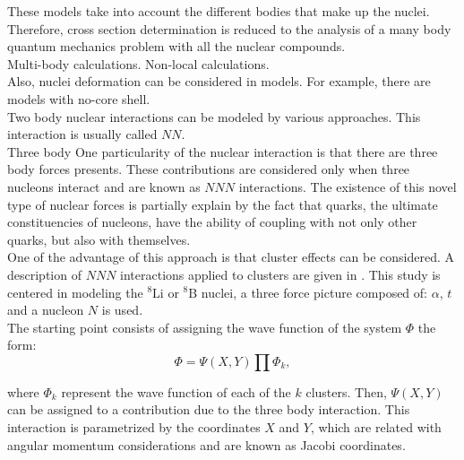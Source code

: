 \documentclass[openany]{book}
\begin{document}
These models take into account the different bodies that make up the nuclei. \\

Therefore,  cross section determination is reduced to the analysis of a many body quantum mechanics problem with all the nuclear compounds. \\

Multi-body calculations.  Non-local calculations. \\

Also, nuclei deformation can be considered in models. For example, there are models with no-core shell. \\

Two body nuclear interactions can be modeled by various approaches. This interaction is usually called $NN$. \\

Three body \cite{grigorenko_danilin_efros_shulgina_zhukov_1998}
One particularity of the nuclear interaction is that there are three body forces presents.  These contributions are considered only when three nucleons interact and are known as $NNN$ interactions. The existence of this novel type of nuclear forces is partially explain by the fact that quarks, the ultimate constituencies of nucleons, have the ability of coupling with not only other quarks, but also with themselves. \\

One of the advantage of this approach is that cluster effects can be considered. A description of $NNN$ interactions applied to clusters are given in  \cite{grigorenko_danilin_efros_shulgina_zhukov_1998}. This study is centered in modeling the $\mathrm{{}^{8}Li}$ or $\mathrm{{}^{8}B}$ nuclei, a three force picture composed of: $\alpha$, $t$ and a nucleon $N$ is used.  \\

The starting point consists of assigning the wave function of the system  $\Phi$  the form:  \\

\begin{equation}\label{eq:micro_threeBody_wavefunction}
	\Phi = \Psi(X, Y) \prod \Phi_k, 
\end{equation}

where $\Phi_k$ represent the wave function of each of the $k$ clusters. Then, $\Psi(X, Y)$ can be assigned to a contribution due to the three body interaction. This interaction is parametrized by the coordinates $X$ and $Y$,  which are related with angular momentum considerations and are known as Jacobi coordinates. \\
\end{document}
